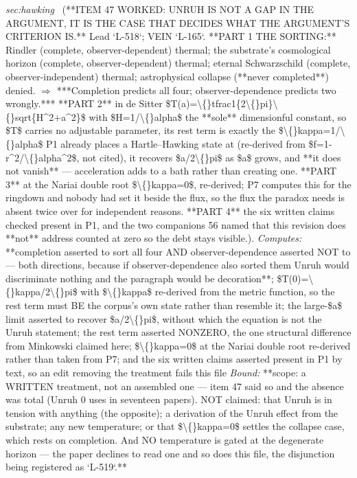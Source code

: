 \begin{description}
\textit{sec:hawking} \ (**ITEM 47 WORKED: UNRUH IS NOT A GAP IN THE ARGUMENT, IT IS THE CASE THAT DECIDES WHAT THE ARGUMENT'S CRITERION IS.** Lead `L-518`; VEIN `L-165`. **PART 1 THE SORTING:** Rindler (complete, observer-dependent) thermal; the substrate's cosmological horizon (complete, observer-dependent) thermal; eternal Schwarzschild (complete, observer-independent) thermal; astrophysical collapse (**never completed**) denied. \ensuremath{\Rightarrow} ***Completion predicts all four; observer-dependence predicts two wrongly.*** **PART 2** in de Sitter \$T(a)=\textbackslash\{\}tfrac1\{2\textbackslash\{\}pi\}\textbackslash\{\}sqrt\{H\textasciicircum{}2+a\textasciicircum{}2\}\$ with \$H=1/\textbackslash\{\}alpha\$ the **sole** dimensionful constant, so \$T\$ carries no adjustable parameter, its rest term is exactly the \$\textbackslash\{\}kappa=1/\textbackslash\{\}alpha\$ P1 already places a Hartle--Hawking state at (re-derived from \$f=1-r\textasciicircum{}2/\textbackslash\{\}alpha\textasciicircum{}2\$, not cited), it recovers \$a/2\textbackslash\{\}pi\$ as \$a\$ grows, and **it does not vanish** --- acceleration adds to a bath rather than creating one. **PART 3** at the Nariai double root \$\textbackslash\{\}kappa=0\$, re-derived; P7 computes this for the ringdown and nobody had set it beside the flux, so the flux the paradox needs is absent twice over for independent reasons. **PART 4** the six written claims checked present in P1, and the two companions 56 named that this revision does **not** address counted at zero so the debt stays visible.). 
\emph{Computes:} **completion asserted to sort all four AND observer-dependence asserted NOT to --- both directions, because if observer-dependence also sorted them Unruh would discriminate nothing and the paragraph would be decoration**; \$T(0)=\textbackslash\{\}kappa/2\textbackslash\{\}pi\$ with \$\textbackslash\{\}kappa\$ re-derived from the metric function, so the rest term must BE the corpus's own state rather than resemble it; the large-\$a\$ limit asserted to recover \$a/2\textbackslash\{\}pi\$, without which the equation is not the Unruh statement; the rest term asserted NONZERO, the one structural difference from Minkowski claimed here; \$\textbackslash\{\}kappa=0\$ at the Nariai double root re-derived rather than taken from P7; and the six written claims asserted present in P1 by text, so an edit removing the treatment fails this file
 \emph{Bound:} **scope: a WRITTEN treatment, not an assembled one --- item 47 said so and the absence was total (Unruh 0 uses in seventeen papers). NOT claimed: that Unruh is in tension with anything (the opposite); a derivation of the Unruh effect from the substrate; any new temperature; or that \$\textbackslash\{\}kappa=0\$ settles the collapse case, which rests on completion.  And NO temperature is gated at the degenerate horizon --- the paper declines to read one and so does this file, the disjunction being registered as `L-519`.**

\end{description}

